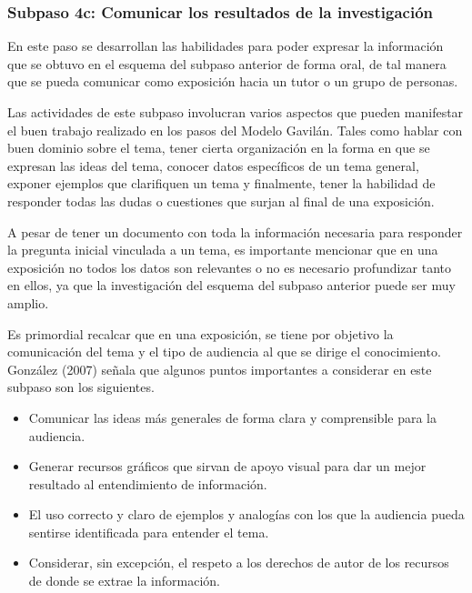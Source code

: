 
\subsubsection{Subpaso 4c: Comunicar los resultados de la investigación}
\label{secPaso4cCap2}

En este paso se desarrollan las habilidades para poder expresar la información que se obtuvo en el esquema del subpaso anterior de forma oral, de tal manera que se pueda comunicar como exposición hacia un tutor o un grupo de personas.

Las actividades de este subpaso involucran varios aspectos que pueden manifestar el buen trabajo realizado en los pasos del Modelo Gavilán. Tales como hablar con buen dominio sobre el tema, tener cierta organización en la forma en que se expresan las ideas del tema, conocer datos específicos de un tema general, exponer ejemplos que clarifiquen un tema y finalmente, tener la habilidad de responder todas las dudas o cuestiones que surjan al final de una exposición.

A pesar de tener un documento con toda la información necesaria para responder la pregunta inicial vinculada a un tema, es importante mencionar que en una exposición no todos los datos son relevantes o no es necesario profundizar tanto en ellos, ya que la investigación del esquema del subpaso anterior puede ser muy amplio.

Es primordial recalcar que en una exposición, se tiene por objetivo la comunicación del tema y el tipo de audiencia al que se dirige el conocimiento. González (2007) señala que algunos puntos importantes a considerar en este subpaso son los siguientes.

\begin{itemize}
  \item Comunicar las ideas más generales de forma clara y comprensible para la audiencia.
  \item Generar recursos gráficos que sirvan de apoyo visual para dar un mejor resultado al entendimiento de información.
  \item El uso correcto y claro de ejemplos y analogías con los que la audiencia pueda sentirse identificada para entender el tema.
  \item Considerar, sin excepción, el respeto a los derechos de autor de los recursos de donde se extrae la información.
\end{itemize}

